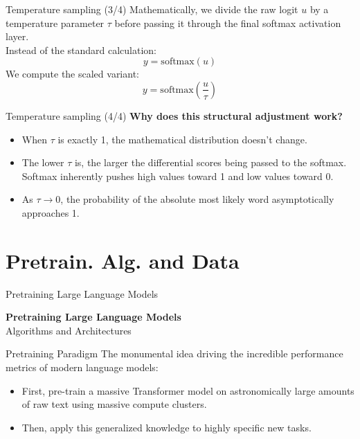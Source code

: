 \documentclass[aspectratio=169]{beamer}
\begin{document}
\begin{frame}{Temperature sampling (3/4)}\justifying
    Mathematically, we divide the raw logit $u$ by a temperature parameter $\tau$ before passing it through the final softmax activation layer. \\
    \vspace{0.5cm}
    Instead of the standard calculation:
    \[ y = \text{softmax}(u) \]
    We compute the scaled variant:
    \[ y = \text{softmax}\left(\frac{u}{\tau}\right) \]
\end{frame}

\begin{frame}{Temperature sampling (4/4)}\justifying
    \textbf{Why does this structural adjustment work?}
    \begin{itemize}
        \item When $\tau$ is exactly 1, the mathematical distribution doesn't change.
        \item The lower $\tau$ is, the larger the differential scores being passed to the softmax. Softmax inherently pushes high values toward 1 and low values toward 0.
        \item As $\tau \to 0$, the probability of the absolute most likely word asymptotically approaches 1.
    \end{itemize}
\end{frame}

\section{Pretrain. Alg. and Data}

\begin{frame}{Pretraining Large Language Models}
    \begin{center}
        \huge \textbf{Pretraining Large Language Models}\\
        \vspace{0.5cm}
        \Large Algorithms and Architectures
    \end{center}
\end{frame}

\begin{frame}{Pretraining Paradigm}\justifying
    The monumental idea driving the incredible performance metrics of modern language models:
    \begin{itemize}
        \item First, pre-train a massive Transformer model on astronomically large amounts of raw text using massive compute clusters.
        \item Then, apply this generalized knowledge to highly specific new tasks.
    \end{itemize}
\end{frame}
\end{document}
